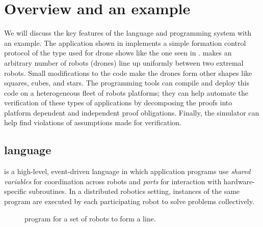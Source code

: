\section{Overview and an example}
\label{sec:overview}

\newcommand{\Motion}{\emph{Motion}\xspace}

We will discuss the key features of the \lgname language and programming system with an example.
The \lgname application \LineForm shown in  implements a simple formation control protocol of the type  used for drone shows like the one seen in .
\LineForm makes an arbitrary number of robots (drones) line up uniformly between two extremal robots.
Small modifications to the code make the drones form other shapes like squares, cubes, and stars.
The \lgname programming tools can compile and deploy this code on a heterogeneous fleet of robots platforms; they can help automate the verification of these types of applications by decomposing the proofs into platform dependent and independent proof obligations. Finally, the \lgname simulator can help find violations of assumptions made for verification.

\subsection{\lgname language}
\label{sec:koord-language}
\lgname is a high-level, event-driven language in which application programs use \emph{shared variables} for coordination across robots
and \emph{ports} for interaction with hardware-specific subroutines.
In a distributed robotics setting, instances of the same \lgname program are executed by each participating robot to solve problems collectively.
\begin{figure}[h!]
            \captionsetup{font=scriptsize}
            \begin{mdframed}
    {
        
    }
    {
        
    }\end{mdframed}
    \caption{\lgname program \LineForm for a set of robots to form a line.}
    \label{fig:lineform}
\end{figure}
\

